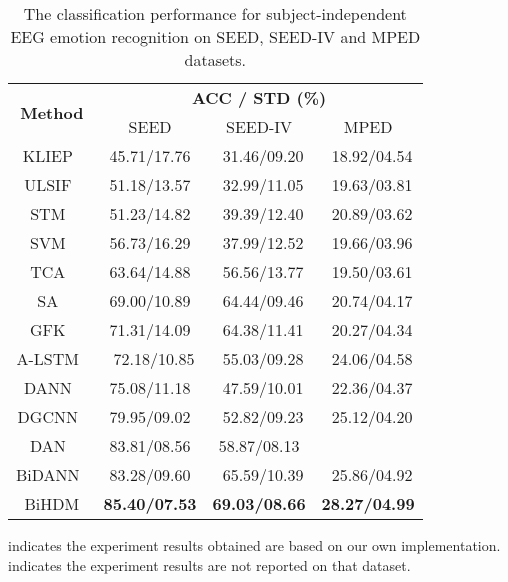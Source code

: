 \documentclass[journal]{IEEEtran}
\begin{document}
\begin{table}[htb]
	\caption{The classification performance for subject-independent EEG emotion recognition on SEED, SEED-IV and MPED datasets.}
	\centering
	\renewcommand{\arraystretch}{1.3}
	\begin{threeparttable}		
		\begin{tabular}{|c|c|c|c|}
			\hline
			\multirow{2}{*}{\textbf{Method}} & \multicolumn{3}{c|}{\textbf{ACC / STD (\%)}} \\ \cline{2-4}
			                        &    SEED         & SEED-IV        & MPED\\ \hline
			KLIEP~\cite{sugiyama2008direct}           & 45.71/17.76     &~31.46/09.20&~18.92/04.54\\ \hline
            ULSIF~\cite{kanamori2009least}            & 51.18/13.57     &~32.99/11.05&~19.63/03.81\\ \hline
            STM~\cite{chu2017selective}               & 51.23/14.82     &~39.39/12.40&~20.89/03.62\\ \hline
			SVM~\cite{suykens1999least}               &   56.73/16.29   &~37.99/12.52&~19.66/03.96\\ \hline
			TCA~\cite{pan2011domain}                  &   63.64/14.88   &~56.56/13.77&~19.50/03.61\\ \hline
			SA~\cite{fernando2013unsupervised}        &   69.00/10.89   &~64.44/09.46&~20.74/04.17\\ \hline
			GFK~\cite{gong2012geodesic}               &   71.31/14.09   &~64.38/11.41&~20.27/04.34\\ \hline
			A-LSTM~\cite{8606087} 				      &~72.18/10.85 &~55.03/09.28&~24.06/04.58\\ \hline
			DANN~\cite{ganin2016domain}               &   75.08/11.18   &~47.59/10.01&~22.36/04.37\\ \hline
			DGCNN~\cite{song2018eeg}                  &   79.95/09.02   &~52.82/09.23&~25.12/04.20\\ \hline
			DAN~\cite{li2018cross}                    &   83.81/08.56   & 58.87/08.13    &             \\ \hline
			BiDANN~\cite{li2018novel}                 &   83.28/09.60   &~65.59/10.39&~25.86/04.92\\ \hline
			BiHDM                   &\textbf{85.40/07.53}&\textbf{69.03/08.66}&\textbf{28.27/04.99}   \\ \hline
		\end{tabular}
		\begin{tablenotes}[para]
			\footnotesize  indicates the experiment results obtained are based on our own implementation.\\
			 indicates the experiment results are not reported on that dataset.
		\end{tablenotes}
	\end{threeparttable}
	\label{Table: ind}
\end{table}
\end{document}
